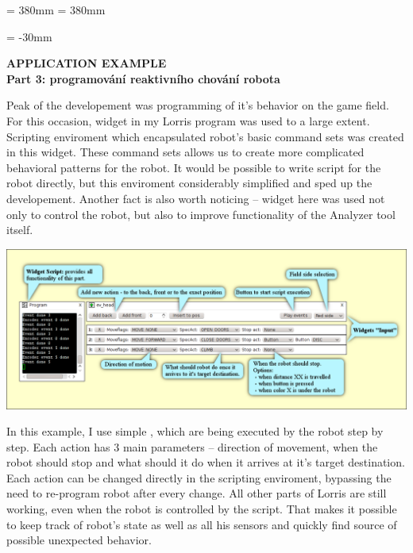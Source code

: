 \documentclass[17pt]{extreport}
\newcommand{\B}{\textbf} %
\begin{document}
\textheight = 380mm
\textwidth = 380mm
\newpage
\enlargethispage{400mm} %
\begin{landscape}
\voffset = -30mm %
\begin{center}
    \Large \B{APPLICATION EXAMPLE \\Part 3: programování reaktivního chování robota}
\end{center}
\vspace{5mm}
Peak of the developement was programming of it's behavior on the game field. For this occasion, widget  in my Lorris program was used to a large extent. Scripting enviroment which encapsulated robot's basic command sets was created in this widget. These command sets allows us to create more complicated behavioral patterns for the robot. It would be possible to write script for the robot directly, but this enviroment considerably simplified and sped up the developement. Another fact is also worth noticing -- widget  here was used not only to control the robot, but also to improve functionality of the Analyzer tool itself.
 
\begin{center}
\includegraphics{img/control2.png}
\end{center}

In this example, I use simple , which are being executed by the robot step by step. Each action has 3 main parameters -- direction of movement, when the robot should stop and what should it do when it arrives at it's target destination. Each action can be changed directly in the scripting enviroment, bypassing the need to re-program robot after every change. All other parts of Lorris are still working, even when the robot is controlled by the script. That makes it possible to keep track of robot's state as well as all his sensors and quickly find source of possible unexpected behavior.
\end{landscape}
\end{document}
